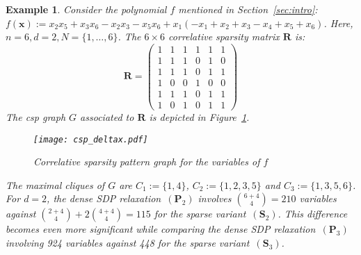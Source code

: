 \documentclass[preprint]{sigplanconf}
\newcommand{\x}{\mathbf{x}}
\def\P{\mathbf{P}}
\def\S{\mathbf{S}}
\def\S{\mathbf{S}}
\theoremstyle{plain}
\newtheorem{example}{Example}
\begin{document}
\begin{example}
\label{ex:sparse}
Consider the polynomial $f$ mentioned in Section~\ref{sec:intro}:
$f(\x) := x_2 x_5 + x_3 x_6 - x_2 x_3  - x_5 x_6 
+ x_1 ( - x_1 +  x_2 +  x_3  - x_4 +  x_5 +  x_6)$.
%
Here, $n = 6, d = 2, N = \{1,\dots, 6 \}$. The $6 \times 6$ correlative sparsity matrix $\mathbf{R}$ is:
\[
\mathbf{R} = 
\begin{pmatrix}
  1 & 1 & 1 & 1 & 1 & 1 \\
  1 & 1 & 1 & 0 & 1 & 0 \\
  1 & 1 & 1 & 0 & 1 & 1 \\
  1 & 0 & 0 & 1 & 0 & 0 \\
  1 & 1 & 1 & 0 & 1 & 1 \\
  1 & 0 & 1 & 0 & 1 & 1 
 \end{pmatrix}
\]
The csp graph $G$ associated to $\mathbf{R}$ is depicted in Figure~\ref{fig:csp_deltax}. 
%
\begin{figure}[!ht]	
\begin{center}
\texttt{[image: csp\_deltax.pdf]}
\caption{Correlative sparsity pattern graph for the variables of $f$}
\label{fig:csp_deltax}
\end{center}
\end{figure}
%
The maximal cliques of $G$ are $C_1 := \{1, 4\}$, $C_2 := \{1, 2, 3, 5\}$ and $C_3 := \{1, 3, 5, 6\}$. For $d=2$, the dense SDP relaxation~$(\P_2)$ involves $\binom{6 + 4}{4} = 210$ variables against $\binom{2 + 4}{4} + 2 \binom{4 + 4}{4} = 115$ for the sparse variant~$(\S_2)$. This difference becomes even more significant while comparing the dense SDP relaxation~$(\P_3)$ involving 924 variables against 448 for the sparse variant~$(\S_3)$.
\end{example}
%
\end{document}
